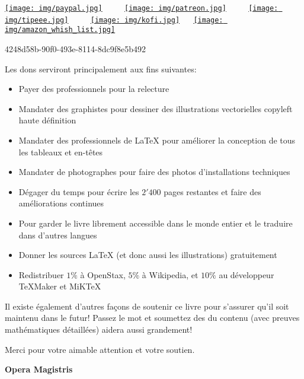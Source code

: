 \documentclass[12pt,a4paper,twoside,openright]{report}
\theoremstyle{definition}
\theoremstyle{itexmp}
\numberwithin{equation}{section}
\begin{document}
	\begin{center}
	\href{http://www.sciences.ch/htmlfr/donate.php}{\texttt{[image: img/paypal.jpg]}} $\qquad$ \href{https://www.patreon.com/sciences}{\texttt{[image: img/patreon.jpg]}} $\qquad$ \href{https://www.tipeee.com/elements-of-applied-mathematics}{\texttt{[image: img/tipeee.jpg]}} $\qquad$ \href{http://ko-fi.com/operamagistris}{\texttt{[image: img/kofi.jpg]}} $\quad$ \href{http://a.co/cqLIx5V}{\texttt{[image: img/amazon\_whish\_list.jpg]}}
	\end{center}
	\begin{center}
		{\large \faBitcoin} 4248d58b-90f0-493e-8114-8dc9f8e5b492
	\end{center}
	Les dons serviront principalement aux fins suivantes:
	\begin{itemize}
		\item Payer des professionnels pour la relecture
		\item Mandater des graphistes pour dessiner des illustrations vectorielles copyleft haute définition
		\item Mandater des professionnels de  \LaTeX{} pour améliorer la conception de tous les tableaux et en-têtes
		\item Mandater de photographes pour faire des photos d'installations techniques
		\item Dégager du temps pour écrire les $2'400$ pages restantes et faire des améliorations continues
		\item Pour garder le livre librement accessible dans le monde entier et le traduire dans d'autres langues
		\item Donner les sources \LaTeX{} (et donc aussi les illustrations) gratuitement
		\item Redistribuer $1\%$ à OpenStax, $5\%$ à Wikipedia, et $10\%$ au développeur TeXMaker et MiKTeX
	\end{itemize}
	Il existe également d'autres façons de soutenir ce livre pour s'assurer qu'il soit maintenu dans le futur! Passez le mot et soumettez des du contenu (avec preuves mathématiques détaillées) aidera aussi grandement!
	
	Merci pour votre aimable attention et votre soutien.
	
	\newpage\null\thispagestyle{empty}\newpage %
	\pagestyle{empty}
	\pagecolor{gray}
	{\Huge \textbf{Opera Magistris}}
	
\end{document}
